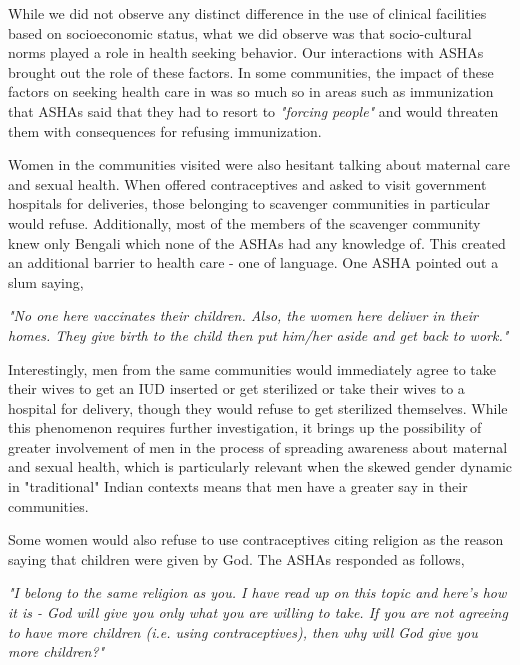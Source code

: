 While we did not observe any distinct difference in the use of clinical facilities based on socioeconomic status, what we did observe was that socio-cultural norms played a role in health seeking behavior. Our interactions with ASHAs brought out the role of these factors. In some communities, the impact of these factors on seeking health care in was so much so in areas such as immunization that ASHAs said that they had to resort to \textit{"forcing people"} and would threaten them with consequences for refusing immunization.

Women in the communities visited were also hesitant talking about maternal care and sexual health. When offered contraceptives and asked to visit government hospitals for deliveries, those belonging to scavenger communities in particular would refuse. Additionally, most of the members of the scavenger community knew only Bengali which none of the ASHAs had any knowledge of. This created an additional barrier to health care - one of language. One ASHA pointed out a slum saying,

\textit{"No one here vaccinates their children. Also, the women here deliver in their homes. They give birth to the child then put him/her aside and get back to work."} 

Interestingly, men from the same communities would immediately agree to take their wives to get an IUD inserted or get sterilized or take their wives to a hospital for delivery, though they would refuse to get sterilized themselves. While this phenomenon requires further investigation, it brings up the possibility of greater involvement of men in the process of spreading awareness about maternal and sexual health, which is particularly relevant when the skewed gender dynamic in "traditional" Indian contexts means that men have a greater say in their communities. %

Some women would also refuse to use contraceptives citing religion as the reason saying that children were given by God. The ASHAs responded as follows,

\textit{"I belong to the same religion as you. I have read up on this topic and here's how it is - God will give you only what you are willing to take. If you are not agreeing to have more children (i.e. using contraceptives), then why will God give you more children?"}

